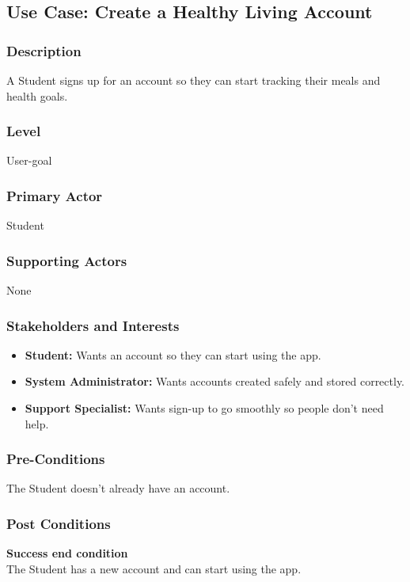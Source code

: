 \documentclass[10pt,letterpaper]{article}
\begin{document}
\subsection*{Use Case: Create a Healthy Living Account}

\subsubsection*{Description}
A Student signs up for an account so they can start tracking their meals and health goals.

\subsubsection*{Level}
User-goal

\subsubsection*{Primary Actor}
Student

\subsubsection*{Supporting Actors}
None

\subsubsection*{Stakeholders and Interests}
\begin{itemize}
    \item \textbf{Student:} Wants an account so they can start using the app.
    \item \textbf{System Administrator:} Wants accounts created safely and stored correctly.
    \item \textbf{Support Specialist:} Wants sign-up to go smoothly so people don't need help.
\end{itemize}

\subsubsection*{Pre-Conditions}
The Student doesn't already have an account.

\subsubsection*{Post Conditions}

\textbf{Success end condition}\\
The Student has a new account and can start using the app.
\end{document}
